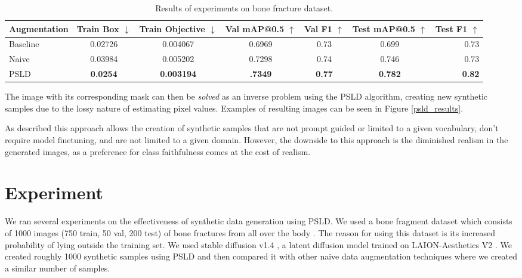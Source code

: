 \documentclass{article}
\begin{document}
\begin{table}[ht!]
\centering
\caption{Results of experiments on bone fracture dataset.}
\label{results}
\begin{tabular}{lcccccr}
\toprule
Augmentation & Train Box $\downarrow$ & Train Objective $\downarrow$ & Val mAP@0.5 $\uparrow$ & Val F1  $\uparrow$ & Test mAP@0.5 $\uparrow$ & Test F1 $\uparrow$\\
\midrule
Baseline & 0.02726 & 0.004067 & 0.6969 & 0.73 & 0.699 & 0.73\\
Naive &  0.03984 & 0.005202 & 0.7298 & 0.74 & 0.746 & 0.73\\
PSLD & \textbf{0.0254} & \textbf{0.003194} & \textbf{.7349} &  \textbf{0.77} & \textbf{0.782} & \textbf{0.82} \\
\bottomrule
\end{tabular}
\end{table}

The image with its corresponding mask can then be \textit{solved} as an inverse problem using the PSLD algorithm, creating new synthetic samples due to the lossy nature
of estimating pixel values. Examples of resulting images can be seen in Figure \ref{psld_results}.

As described this approach allows the creation of synthetic samples that are not prompt guided or limited to a given vocabulary, don't require model
finetuning, and are not limited to a given domain. However, the downside to this approach is the diminished realism in the generated images, as a preference 
for class faithfulness comes at the cost of realism.



\section{Experiment}

We ran several experiments on the effectiveness of synthetic data generation using PSLD. We used a bone fragment dataset which consists of 1000 images 
(750 train, 50 val, 200 test) of bone fractures from all over the body \cite{bone-fracture-detection-ivsy6_dataset}. The reason for using this dataset is 
its increased probability of lying outside the training set. We used stable diffusion v1.4 \cite{Rombach_2022_CVPR}, a latent diffusion model trained on 
LAION-Aesthetics V2 \cite{2210.08402}. We created roughly 1000 synthetic samples using PSLD and then compared it with other naive data augmentation techniques 
where we created a similar number of samples.
\end{document}
